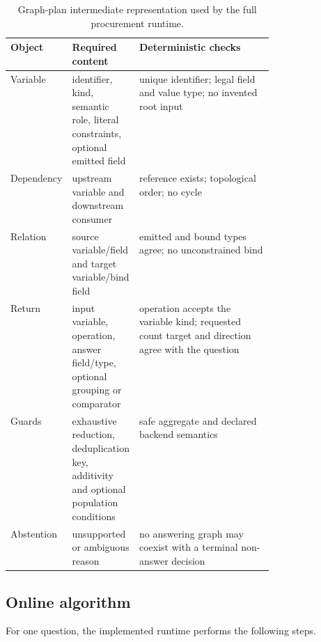 \begin{table}[h]
  \centering
  \caption{Graph-plan intermediate representation used by the full procurement runtime.}
  \label{tab:graph-ir}
  \small
  \begin{tabularx}{\linewidth}{p{0.19\linewidth}p{0.25\linewidth}X}
    \toprule
    Object & Required content & Deterministic checks \\
    \midrule
    Variable & identifier, kind, semantic role, literal constraints, optional emitted field & unique identifier; legal field and value type; no invented root input \\
    Dependency & upstream variable and downstream consumer & reference exists; topological order; no cycle \\
    Relation & source variable/field and target variable/bind field & emitted and bound types agree; no unconstrained bind \\
    Return & input variable, operation, answer field/type, optional grouping or comparator & operation accepts the variable kind; requested count target and direction agree with the question \\
    Guards & exhaustive reduction, deduplication key, additivity and optional population conditions & safe aggregate and declared backend semantics \\
    Abstention & unsupported or ambiguous reason & no answering graph may coexist with a terminal non-answer decision \\
    \bottomrule
  \end{tabularx}
\end{table}

\subsection{Online algorithm}

For one question, the implemented runtime performs the following steps.

